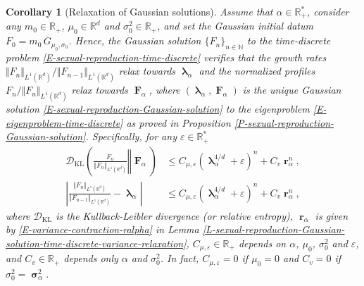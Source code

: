 \documentclass[reqno]{amsart}
\newtheorem{corollary}[definition]{Corollary}
\DeclareMathOperator{\blambda}{\boldsymbol{\lambda}}
\DeclareMathOperator{\bsigma}{\boldsymbol{\sigma}}
\DeclareMathOperator{\bF}{\boldsymbol{F}}
\DeclareMathOperator{\br}{\boldsymbol{r}}
\numberwithin{equation}{section}
\begin{document}
{\begin{corollary}[Relaxation of Gaussian solutions]\label{C-sexual-reproduction-Gaussian-solution-time-discrete-relaxation}
Assume that $\alpha\in \mathbb{R}_+^*$, consider any $m_0\in \mathbb{R}_+$, $\mu_0\in \mathbb{R}^d$ and $\sigma_0^2\in \mathbb{R}_+$, and set the Gaussian initial datum $F_0=m_0\,G_{\mu_0,\sigma_0}$. Hence, the Gaussian solution $\{F_n\}_{n\in \mathbb{N}}$ to the time-discrete problem \eqref{E-sexual-reproduction-time-discrete} verifies that the growth rates $\Vert F_n\Vert_{L^1(\mathbb{R}^d)}/\Vert F_{n-1}\Vert_{L^1(\mathbb{R}^d)}$ relax towards $\blambda_\alpha$ and the normalized profiles $F_n/\Vert F_n\Vert_{L^1(\mathbb{R}^d)}$ relax towards $\bF_\alpha$, where $(\blambda_\alpha,\bF_\alpha)$ is the unique Gaussian solution \eqref{E-sexual-reproduction-Gaussian-solution} to the eigenproblem \eqref{E-eigenproblem-time-discrete} as proved in Proposition \ref{P-sexual-reproduction-Gaussian-solution}. Specifically, for any $\varepsilon\in \mathbb{R}_+^*$
\begin{align*}
\mathcal{D}_{\text{KL}}\left(\left.\frac{F_n}{\Vert F_n\Vert_{L^1(\mathbb{R}^d)}}\right\Vert \bF_\alpha\right)&\leq C_{\mu,\varepsilon}(\blambda_\alpha^{4/d}+\varepsilon)^n+C_v\br_\alpha^n,\\
\left\vert\frac{\Vert F_n\Vert_{L^1(\mathbb{R}^d)}}{\Vert F_{n-1}\Vert_{L^1(\mathbb{R}^d)}}-\blambda_\alpha\right\vert&\leq C_{\mu,\varepsilon}(\blambda_\alpha^{4/d}+\varepsilon)^n+C_v\br_\alpha^n,
\end{align*}
where $\mathcal{D}_{\text{KL}}$ is the Kullback-Leibler divergence (or relative entropy), $\br_\alpha$ is given by \eqref{E-variance-contraction-ralpha} in Lemma \ref{L-sexual-reproduction-Gaussian-solution-time-discrete-variance-relaxation}, $C_{\mu,\varepsilon}\in \mathbb{R}_+$ depends on $\alpha$, $\mu_0$, $\sigma_0^2$ and $\varepsilon$, and $C_v\in \mathbb{R}_+$ depends only $\alpha$ and $\sigma_0^2$. In fact, $C_{\mu,\varepsilon}=0$ if $\mu_0=0$ and $C_v=0$ if $\sigma_0^2=\bsigma_\alpha^2$.
\end{corollary}

}
\end{document}
